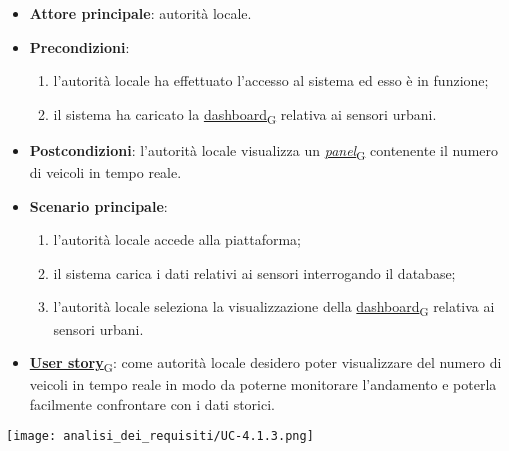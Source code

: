 \begin{itemize}
	\item \textbf{Attore principale}: autorità locale.
	\item \textbf{Precondizioni}:
	      \begin{enumerate}
		      \item l'autorità locale ha effettuato l'accesso al sistema ed esso è in funzione;
		      \item il sistema ha caricato la \href{https://7last.github.io/docs/pb/documentazione-interna/glossario\#dashboard}{dashboard\textsubscript{G}} relativa ai sensori urbani.
	      \end{enumerate}
	\item \textbf{Postcondizioni}: l'autorità locale visualizza un \href{https://7last.github.io/docs/pb/documentazione-interna/glossario\#panel}{\textit{panel}\textsubscript{G}} contenente il numero di veicoli in tempo reale.
	\item \textbf{Scenario principale}:
	      \begin{enumerate}
		      \item l'autorità locale accede alla piattaforma;
		      \item il sistema carica i dati relativi ai sensori interrogando il database;
		      \item l'autorità locale seleziona la visualizzazione della \href{https://7last.github.io/docs/pb/documentazione-interna/glossario\#dashboard}{dashboard\textsubscript{G}} relativa ai sensori urbani.
	      \end{enumerate}
	\item \href{https://7last.github.io/docs/pb/documentazione-interna/glossario\#user-story}{\textbf{User story}\textsubscript{G}}:
	      come autorità locale desidero poter visualizzare del numero di veicoli in tempo reale in modo da poterne monitorare l'andamento
	      e poterla facilmente confrontare con i dati storici.
\end{itemize}
\begin{center}
	\texttt{[image: analisi\_dei\_requisiti/UC-4.1.3.png]}
\end{center}


